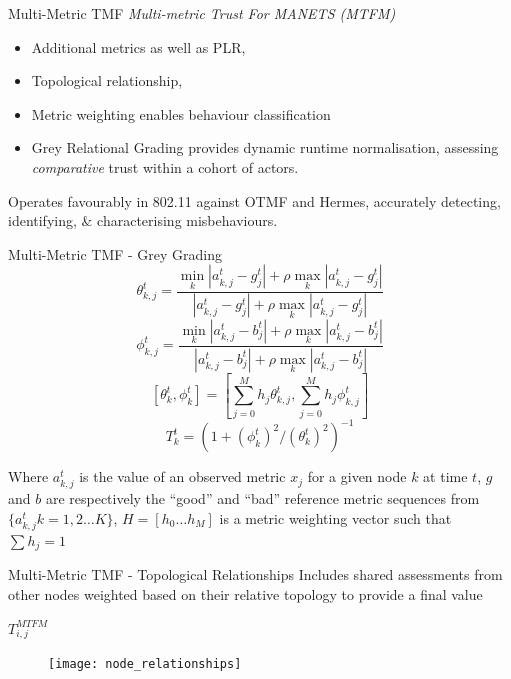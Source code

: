 \documentclass{beamer}
\begin{document}
\begin{frame}{Multi-Metric TMF} 
  \emph{Multi-metric Trust For MANETS (MTFM)} \autocite{Guo11} 
  \begin{itemize}
    \item Additional metrics as well as PLR, 
    \item Topological relationship,
    \item Metric weighting enables behaviour classification
    \item Grey Relational Grading provides dynamic runtime normalisation, assessing \emph{comparative} trust within a cohort of actors.
  \end{itemize}
  \pause
  \centering
  Operates favourably in 802.11 against OTMF and Hermes, accurately detecting, identifying, \& characterising misbehaviours.\autocite{Guo11} 
\end{frame}
\begin{frame}{Multi-Metric TMF - Grey Grading} 
\begin{equation}
  \label{eq:grcg}
  \theta_{k,j}^t = \frac{\min_k|a_{k,j}^t - g_j^t| + \rho \max_k|a_{k,j}^t-g_j^t|}{|a_{k,j}^t-g_j^t| + \rho \max_k|a_{k,j}^t-g_j^t|} 
\end{equation}
\begin{equation}
  \label{eq:grcb}
  \phi_{k,j}^t = \frac{\min_k|a_{k,j}^t - b_j^t| + \rho \max_k|a_{k,j}^t-b_j^t|}{|a_{k,j}^t-b_j^t| + \rho \max_k|a_{k,j}^t-b_j^t|} 
\end{equation}
\begin{equation}
  \label{eq:grc}
  [\theta_k^t, \phi_k^t] = \left[\sum_{j=0}^M h_j \theta_{k,j}^t,\sum_{j=0}^M h_j \phi_{k,j}^t \right]
\end{equation}
\begin{equation}
  \label{eq:grcT}
  T_k^t = ({1+{(\phi_k^t)^2}/{(\theta_k^t)^2}})^{-1}
\end{equation}

Where  $a_{k,j}^t$ is the value of an observed metric $x_j$ for a given node $k$ at time $t$,  $g$ and $b$ are respectively the ``good'' and ``bad'' reference metric sequences from $\{a_{k,j}^t k=1,2\dots K\}$, $H=[h_0\dots h_M]$ is a metric weighting vector such that $\sum h_j = 1$

\end{frame}
\begin{frame}{Multi-Metric TMF - Topological Relationships} 
  \centering
  Includes shared assessments from other nodes weighted based on their relative topology to provide a final value\footnotemark  

  \vspace{9pt}

  $T_{i,j}^{MTFM}$
    \begin{figure}[h]
      \centering
      \texttt{[image: node\_relationships]}
      \label{fig:node_relationships}
    \end{figure}

\end{frame}
\end{document}
